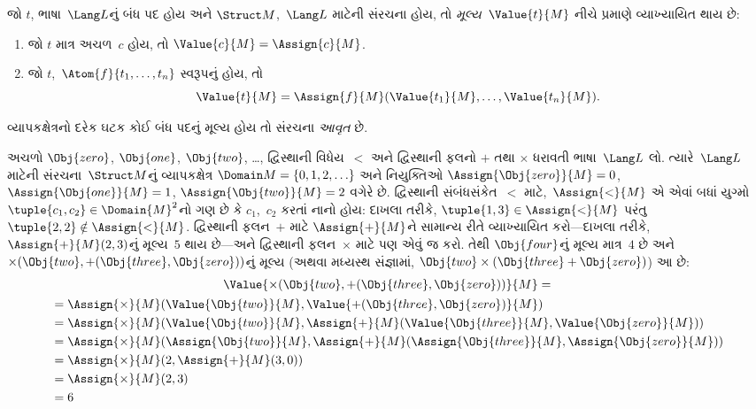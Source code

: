 \begin{defn}[બંધ પદોનું મૂલ્ય]
જો $t$, ભાષા~$\Lang L$નું બંધ પદ હોય અને $\Struct M$,~$\Lang L$
માટેની સંરચના હોય, તો \emph{મૂલ્ય}~$\Value{t}{M}$ નીચે
પ્રમાણે વ્યાખ્યાયિત થાય છે:
\begin{enumerate}
\item જો $t$ માત્ર અચળ~$c$ હોય, તો $\Value{c}{M} = \Assign{c}{M}$.
\item જો $t$,~$\Atom{f}{t_1, \ldots, t_n}$ સ્વરૂપનું હોય, તો
  \[
  \Value{t}{M} = \Assign{f}{M}(\Value{t_1}{M}, \ldots,
  \Value{t_n}{M}).
  \]
\end{enumerate}
\end{defn}

\begin{defn}[આવૃત સંરચના]
વ્યાપકક્ષેત્રનો દરેક ઘટક કોઈ બંધ પદનું મૂલ્ય હોય તો સંરચના
\emph{આવૃત} છે.
\end{defn}

\begin{ex}
અચળો $\Obj{zero}$, $\Obj{one}$, $\Obj{two}$, \dots,
દ્વિસ્થાની વિધેય~$<$ અને દ્વિસ્થાની ફલનો $+$ તથા
$\times$ ધરાવતી ભાષા~$\Lang L$ લો. ત્યારે~$\Lang L$ માટેની
સંરચના~$\Struct M$નું વ્યાપકક્ષેત્ર $\Domain M = \{0, 1, 2, \ldots
\}$ અને નિયુક્તિઓ $\Assign{\Obj{zero}}{M} = 0$,
$\Assign{\Obj{one}}{M} = 1$, $\Assign{\Obj{two}}{M} = 2$ વગેરે છે.
દ્વિસ્થાની સંબંધસંકેત~$<$ માટે,~$\Assign{<}{M}$ એ એવાં બધાં યુગ્મો
$\tuple{c_1, c_2} \in \Domain{M}^2$નો ગણ છે કે $c_1$,~$c_2$ કરતાં
નાનો હોય: દાખલા તરીકે, $\tuple{1, 3} \in \Assign{<}{M}$ પરંતુ
$\tuple{2, 2} \notin \Assign{<}{M}$. દ્વિસ્થાની ફલન~$+$
માટે $\Assign{+}{M}$ને સામાન્ય રીતે વ્યાખ્યાયિત કરો---દાખલા તરીકે,
$\Assign{+}{M}(2,3)$નું મૂલ્ય~$5$ થાય છે---અને દ્વિસ્થાની
ફલન~$\times$ માટે પણ એવું જ કરો. તેથી $\Obj{four}$નું
મૂલ્ય માત્ર~$4$ છે અને $\times(\Obj{two},
+(\Obj{three},\Obj{zero}))$નું મૂલ્ય (અથવા મધ્યસ્થ સંજ્ઞામાં,
$\Obj{two} \times (\Obj{three} + \Obj{zero})$) આ છે:
\begin{multline*}
\Value{\times(\Obj{two}, +(\Obj{three},\Obj{zero}))}{M} =\\
\begin{aligned}
& =\Assign{\times}{M}(\Value{\Obj{two}}{M}, \Value{+(\Obj{three}, \Obj{zero})}{M})\\
& = \Assign{\times}{M}(\Value{\Obj{two}}{M}, \Assign{+}{M}(\Value{\Obj{three}}{M},
\Value{\Obj{zero}}{M})) \\
& = \Assign{\times}{M}(\Assign{\Obj{two}}{M}, \Assign{+}{M}(\Assign{\Obj{three}}{M},
\Assign{\Obj{zero}}{M})) \\
& = \Assign{\times}{M}(2, \Assign{+}{M}(3, 0)) \\
& = \Assign{\times}{M}(2, 3) \\
& = 6
\end{aligned}
\end{multline*}
\end{ex}

